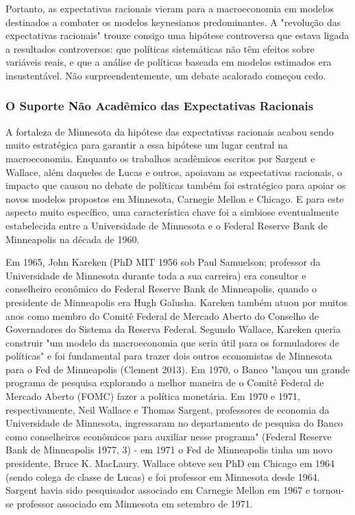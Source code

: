 \documentclass[12pt]{article}
\begin{document}
Portanto, as expectativas racionais vieram para a macroeconomia em modelos destinados a combater os modelos keynesianos predominantes. A "revolução das expectativas racionais" trouxe consigo uma hipótese controversa que estava ligada a resultados controversos: que políticas sistemáticas não têm efeitos sobre variáveis reais, e que a análise de políticas baseada em modelos estimados era insustentável. Não surpreendentemente, um debate acalorado começou cedo.

\subsubsection{\textbf{O Suporte Não Acadêmico das Expectativas Racionais}}

A fortaleza de Minnesota da hipótese das expectativas racionais acabou sendo muito estratégica para garantir a essa hipótese um lugar central na macroeconomia. Enquanto os trabalhos acadêmicos escritos por Sargent e Wallace, além daqueles de Lucas e outros, apoiavam as expectativas racionais, o impacto que causou no debate de políticas também foi estratégico para apoiar os novos modelos propostos em Minnesota, Carnegie Mellon e Chicago. E para este aspecto muito específico, uma característica chave foi a simbiose eventualmente estabelecida entre a Universidade de Minnesota e o Federal Reserve Bank de Minneapolis na década de 1960.

Em 1965, John Kareken (PhD MIT 1956 sob Paul Samuelson; professor da Universidade de Minnesota durante toda a sua carreira) era consultor e conselheiro econômico do Federal Reserve Bank de Minneapolis, quando o presidente de Minneapolis era Hugh Galusha. Kareken também atuou por muitos anos como membro do Comitê Federal de Mercado Aberto do Conselho de Governadores do Sistema da Reserva Federal. Segundo Wallace, Kareken queria construir "um modelo da macroeconomia que seria útil para os formuladores de políticas" e foi fundamental para trazer dois outros economistas de Minnesota para o Fed de Minneapolis (Clement 2013). Em 1970, o Banco "lançou um grande programa de pesquisa explorando a melhor maneira de o Comitê Federal de Mercado Aberto (FOMC) fazer a política monetária. Em 1970 e 1971, respectivamente, Neil Wallace e Thomas Sargent, professores de economia da Universidade de Minnesota, ingressaram no departamento de pesquisa do Banco como conselheiros econômicos para auxiliar nesse programa" (Federal Reserve Bank de Minneapolis 1977, 3) - em 1971 o Fed de Minneapolis tinha um novo presidente, Bruce K. MacLaury. Wallace obteve seu PhD em Chicago em 1964 (sendo colega de classe de Lucas) e foi professor em Minnesota desde 1964. Sargent havia sido pesquisador associado em Carnegie Mellon em 1967 e tornou-se professor associado em Minnesota em setembro de 1971.
\end{document}
